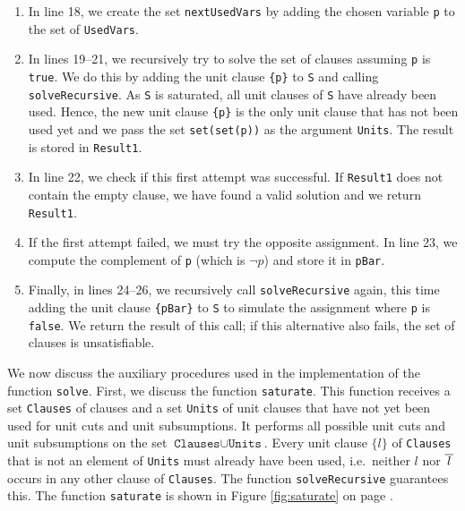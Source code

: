 \begin{enumerate}
  we select an arbitrary variable \texttt{p} from the set of \texttt{Variables} that has not yet been used
  (i.e., it is not in \texttt{UsedVars}).  It is very important to use the function \texttt{arb} here, as
  \texttt{arb} picks a random element from a set.  If we instead used a function that always picks the
  first element of a given set, the performance of the implementation would degrade seriously.
\item In line 18, we create the set \texttt{nextUsedVars} by adding the chosen variable \texttt{p} to the set
  of \texttt{UsedVars}.
\item In lines 19--21, we recursively try to solve the set of clauses assuming \texttt{p} is \texttt{true}. We
  do this by adding the unit clause \texttt{\{p\}} to \texttt{S} and calling \texttt{solveRecursive}.  As
  \texttt{S} is saturated, all unit clauses of \texttt{S} have already been used.  Hence, the new unit clause
  \texttt{\{p\}} is the only unit clause that has not been used yet and we pass the set
  \texttt{set(set(p))} as the argument \texttt{Units}.  The result is stored in \texttt{Result1}.
\item In line 22, we check if this first attempt was successful. If \texttt{Result1} does not contain the empty
  clause, we have found a valid solution and we return \texttt{Result1}.
\item If the first attempt failed, we must try the opposite assignment. In line 23, we compute the complement
  of \texttt{p} (which is $\neg p$) and store it in \texttt{pBar}.
\item Finally, in lines 24--26, we recursively call \texttt{solveRecursive} again, this time adding the unit
  clause \texttt{\{pBar\}} to \texttt{S} to simulate the assignment where \texttt{p} is \texttt{false}. We
  return the result of this call; if this alternative also fails, the set of clauses is unsatisfiable.
\end{enumerate}

We now discuss the auxiliary procedures used in the implementation of the function
\texttt{solve}.
First, we discuss the function \texttt{saturate}. This function receives a
set \texttt{Clauses} of clauses and a set \texttt{Units} of unit clauses that have not yet been used for unit
cuts and unit subsumptions.  It performs all possible unit cuts and unit subsumptions on the set
$\texttt{Clauses} \cup \texttt{Units}$.  Every unit clause $\{l\}$ of \texttt{Clauses} that is not an element of
\texttt{Units} must already have been used, i.e.~neither $l$ nor $\overline{\,l\,}$ occurs in any other clause of
\texttt{Clauses}.  The function \texttt{solveRecursive} guarantees this.
The function \texttt{saturate} is shown in Figure \ref{fig:saturate} on page \pageref{fig:saturate}.

